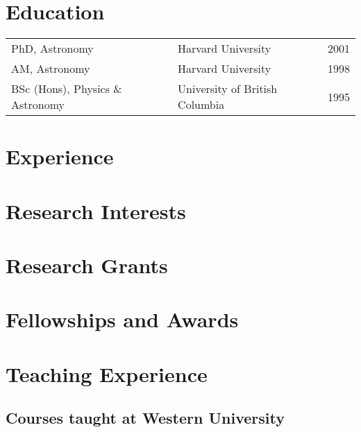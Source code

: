 \documentclass[12pt]{article}
\begin{document}
\maketitle

\section{Education}
\begin{tabularx}{\textwidth}{lXr}
PhD, Astronomy & Harvard University & 2001\\
AM, Astronomy & Harvard University & 1998\\
BSc (Hons),  Physics \& Astronomy & University of British Columbia&1995\\
\end{tabularx}

\section{Experience} 


\section{Research Interests}



\section{Research Grants}




%


\section{Fellowships and Awards}


\section{Teaching Experience}

\subsection{Courses taught at Western University}

\end{document}
